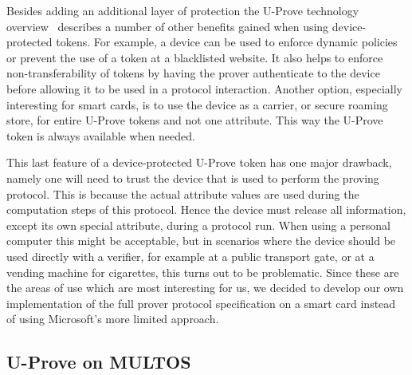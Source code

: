 Besides adding an additional layer of protection the U-Prove technology
overview~\cite{U-Prove_Overview2011} describes a number of other benefits
gained when using device-protected tokens. For example, a device can be
used to enforce dynamic policies or prevent the use of a token at a
blacklisted website. It also helps to enforce non-transferability of tokens
by having the prover authenticate to the device before allowing it to be
used in a protocol interaction. Another option, especially interesting for
smart cards, is to use the device as a carrier, or secure roaming store,
for entire U-Prove tokens and not one attribute. This way the U-Prove token
is always available when needed.

This last feature of a device-protected U-Prove token has one major
drawback, namely one will need to trust the device that is used to perform
the proving protocol. This is because the actual attribute values are used
during the computation steps of this protocol. Hence the device must
release all information, except its own special attribute, during a
protocol run. When using a personal computer this might be acceptable, but
in scenarios where the device should be used directly with a verifier, for
example at a public transport gate, or at a vending machine for cigarettes,
this turns out to be problematic. Since these are the areas of use which
are most interesting for us, we decided to develop our own implementation
of the full prover protocol specification on a smart card instead of using
Microsoft's more limited approach.

\subsection{U-Prove on MULTOS}

